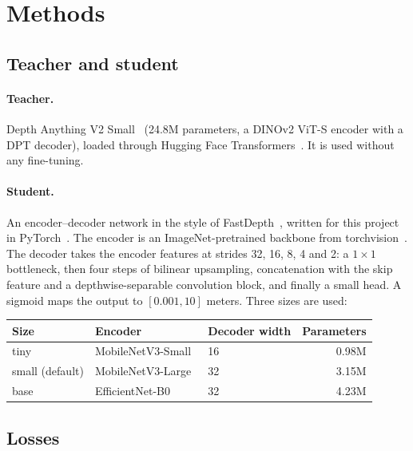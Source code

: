 \documentclass[11pt]{article}
\begin{document}
\section{Methods}

\subsection{Teacher and student}

\paragraph{Teacher.} Depth Anything V2 Small~\cite{yang2024dav2} (24.8M parameters, a DINOv2
ViT-S encoder with a DPT decoder), loaded through Hugging Face Transformers~\cite{wolf2020}. It is
used without any fine-tuning.

\paragraph{Student.} An encoder--decoder network in the style of FastDepth~\cite{wofk2019},
written for this project in PyTorch~\cite{paszke2019}. The encoder is an ImageNet-pretrained
backbone from torchvision~\cite{paszke2019}. The decoder takes the encoder features at strides 32,
16, 8, 4 and 2: a $1\times1$ bottleneck, then four steps of bilinear upsampling, concatenation with
the skip feature and a depthwise-separable convolution block, and finally a small head. A sigmoid
maps the output to $[0.001, 10]$ meters. Three sizes are used:

\begin{center}\small
\begin{tabular}{@{}lllr@{}}
\toprule
Size & Encoder & Decoder width & Parameters \\
\midrule
tiny  & MobileNetV3-Small~\cite{howard2019} & 16 & 0.98M \\
small (default) & MobileNetV3-Large~\cite{howard2019} & 32 & 3.15M \\
base  & EfficientNet-B0~\cite{tan2019} & 32 & 4.23M \\
\bottomrule
\end{tabular}
\end{center}

\subsection{Losses}
\end{document}
